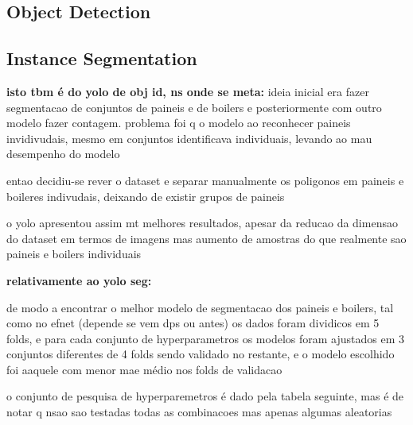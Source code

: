 \documentclass[conference]{IEEEtran}
\begin{document}
\subsection{Object Detection}

\subsection{Instance Segmentation}



\textbf{isto tbm é do yolo de obj id, ns onde se meta:} ideia inicial era fazer segmentacao de conjuntos de paineis e de boilers e posteriormente com outro modelo fazer contagem. problema foi q o modelo ao reconhecer paineis invidivudais, mesmo em conjuntos identificava individuais, levando ao mau desempenho do modelo

entao decidiu-se rever o dataset e separar manualmente os poligonos em paineis e boileres indivudais, deixando de existir grupos de paineis

o yolo apresentou assim mt melhores resultados, apesar da reducao da dimensao do dataset em termos de imagens mas aumento de amostras do que realmente sao paineis e boilers individuais

\textbf{relativamente ao yolo seg:}

de modo a encontrar o melhor modelo de segmentacao dos paineis e boilers, tal como no efnet (depende se vem dps ou antes) os dados foram dividicos em 5 folds, e para cada conjunto de hyperparametros os modelos foram ajustados em 3 conjuntos diferentes de 4 folds sendo validado no restante, e o modelo escolhido foi aaquele com menor mae médio nos folds de validacao

o conjunto de pesquisa de hyperparemetros é dado pela tabela seguinte, mas é de notar q nsao sao testadas todas as combinacoes mas apenas algumas aleatorias
\end{document}
